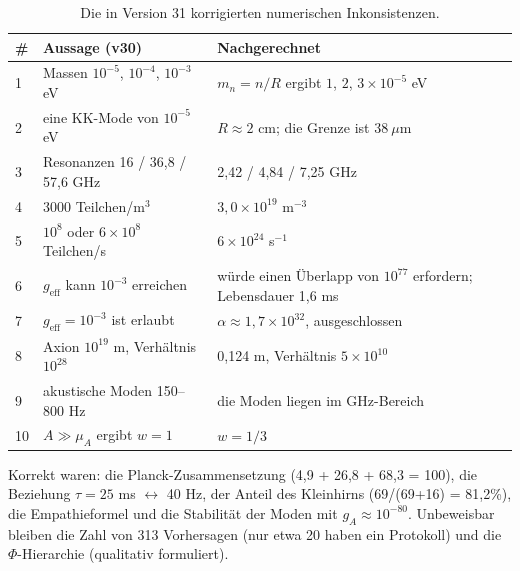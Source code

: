 \documentclass[11pt,a4paper]{article}
\begin{document}
\begin{table}[H]
\centering
\small
\begin{tabular}{@{}p{0.5cm}p{6.2cm}p{5.2cm}@{}}
\toprule
\# & \textbf{Aussage (v30)} & \textbf{Nachgerechnet} \\ \midrule
1 & Massen $10^{-5}$, $10^{-4}$, $10^{-3}$ eV & $m_n = n/R$ ergibt $1$, $2$, $3 \times 10^{-5}$ eV \\
2 & eine KK-Mode von $10^{-5}$ eV & $R \approx 2$ cm; die Grenze ist $38\ \mu$m \\
3 & Resonanzen 16 / 36,8 / 57,6 GHz & 2,42 / 4,84 / 7,25 GHz \\
4 & 3000 Teilchen/m$^3$ & $3,0\times10^{19}$ m$^{-3}$ \\
5 & $10^8$ oder $6\times10^8$ Teilchen/s & $6\times10^{24}$ s$^{-1}$ \\
6 & $g_{\text{eff}}$ kann $10^{-3}$ erreichen & würde einen Überlapp von $10^{77}$ erfordern; Lebensdauer 1,6 ms \\
7 & $g_{\text{eff}} = 10^{-3}$ ist erlaubt & $\alpha \approx 1,7\times10^{32}$, ausgeschlossen \\
8 & Axion $10^{19}$ m, Verhältnis $10^{28}$ & 0,124 m, Verhältnis $5\times10^{10}$ \\
9 & akustische Moden 150--800 Hz & die Moden liegen im GHz-Bereich \\
10 & $A \gg \mu_A$ ergibt $w = 1$ & $w = 1/3$ \\ \bottomrule
\end{tabular}
\caption{Die in Version 31 korrigierten numerischen Inkonsistenzen.}
\label{tab:audit}
\end{table}

Korrekt waren: die Planck-Zusammensetzung (4,9 + 26,8 + 68,3 = 100), die Beziehung $\tau = 25$ ms $\leftrightarrow$ 40 Hz, der Anteil des Kleinhirns (69/(69+16) = 81,2\%), die Empathieformel und die Stabilität der Moden mit $g_A \approx 10^{-80}$. Unbeweisbar bleiben die Zahl von 313 Vorhersagen (nur etwa 20 haben ein Protokoll) und die $\Phi$-Hierarchie (qualitativ formuliert).
\end{document}
